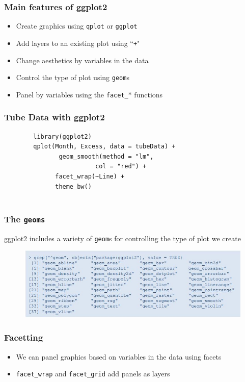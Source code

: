 \documentclass[MASTER.tex]{subfiles}
\begin{document}
 

\begin{frame}
\frametitle{Main features of ggplot2}
\Large
\begin{itemize}
	\item Create graphics using \texttt{qplot} or \texttt{ggplot}
	\item Add layers to an existing plot using ``\texttt{+}"
	\item Change aesthetics by variables in the data
	\item Control the type of plot using \texttt{geom}s
	\item Panel by variables using the \texttt{facet\_$\ast$} functions
\end{itemize}

\end{frame}
\begin{frame}[fragile]

		\frametitle{Tube Data with ggplot2}
		\Large
	\begin{framed}
		\begin{verbatim}
		library(ggplot2)
		qplot(Month, Excess, data = tubeData) +
			   geom_smooth(method = "lm", 
					     col = "red") +
			  facet_wrap(~Line) +
			  theme_bw()
		
		\end{verbatim}
	\end{framed}
\end{frame}
\begin{frame}[fragile]
	\frametitle{The \texttt{geoms}}
\Large
ggplot2 includes a variety of \texttt{geom}s for
		controlling the type of plot we create

\begin{figure}
\centering
\includegraphics[width=1.05\linewidth]{gott-geoms}
\end{figure}


\end{frame}
\begin{frame}
	\Large
	\frametitle{Facetting}
	\begin{itemize}
		\item We can panel graphics based on variables in the
		data using facets
		\item \texttt{facet\_wrap} and \texttt{facet\_grid} add panels as layers
	\end{itemize}
\end{frame}
\end{document}
